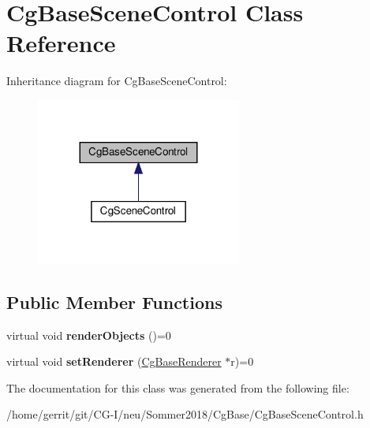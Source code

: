\hypertarget{class_cg_base_scene_control}{}\section{Cg\+Base\+Scene\+Control Class Reference}
\label{class_cg_base_scene_control}


Inheritance diagram for Cg\+Base\+Scene\+Control\+:
\nopagebreak
\begin{figure}[H]
\begin{center}
\leavevmode
\includegraphics[width=191pt]{class_cg_base_scene_control__inherit__graph}
\end{center}
\end{figure}
\subsection*{Public Member Functions}
\begin{DoxyCompactItemize}
\item 
\mbox{\label{class_cg_base_scene_control_a607b65a42cc356725cd077f80bef5d11}} 
virtual void {\bfseries render\+Objects} ()=0
\item 
\mbox{\label{class_cg_base_scene_control_a216cdf465a2fa95dd5309ecde732928d}} 
virtual void {\bfseries set\+Renderer} (\hyperlink{class_cg_base_renderer}{Cg\+Base\+Renderer} $\ast$r)=0
\end{DoxyCompactItemize}


The documentation for this class was generated from the following file\+:\begin{DoxyCompactItemize}
\item 
/home/gerrit/git/\+C\+G-\/\+I/neu/\+Sommer2018/\+Cg\+Base/Cg\+Base\+Scene\+Control.\+h\end{DoxyCompactItemize}

